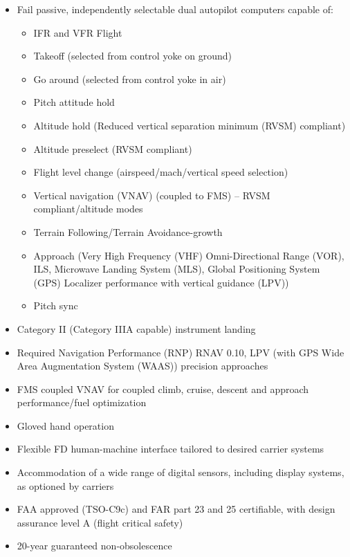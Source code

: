 \begin{itemize}
    \item Fail passive, independently selectable dual autopilot computers capable of:
        \begin{itemize}
            \item IFR and VFR Flight
            \item Takeoff (selected from control yoke on ground)
            \item Go around (selected from control yoke in air)
            \item Pitch attitude hold
            \item Altitude hold (Reduced vertical separation minimum (RVSM) compliant)
            \item Altitude preselect (RVSM compliant)
            \item Flight level change (airspeed/mach/vertical speed selection)
            \item Vertical navigation (VNAV) (coupled to FMS) – RVSM compliant/altitude modes
            \item Terrain Following/Terrain Avoidance-growth
            \item Approach (Very High Frequency (VHF) Omni-Directional Range (VOR), ILS, Microwave Landing System (MLS), Global Positioning System (GPS) Localizer performance with vertical guidance (LPV))
            \item Pitch sync
        \end{itemize}
    \item Category II (Category IIIA capable) instrument landing
    \item Required Navigation Performance (RNP) RNAV 0.10, LPV (with GPS Wide Area Augmentation System (WAAS)) precision approaches
    \item FMS coupled VNAV for coupled climb, cruise, descent and approach performance/fuel optimization
    \item Gloved hand operation
    \item Flexible FD human-machine interface tailored to desired carrier systems
    \item Accommodation of a wide range of digital sensors, including display systems, as optioned by carriers
    \item FAA approved (TSO-C9c) and FAR part 23 and 25 certifiable, with design assurance level A (flight critical safety)
    \item 20-year guaranteed non-obsolescence
\end{itemize}

